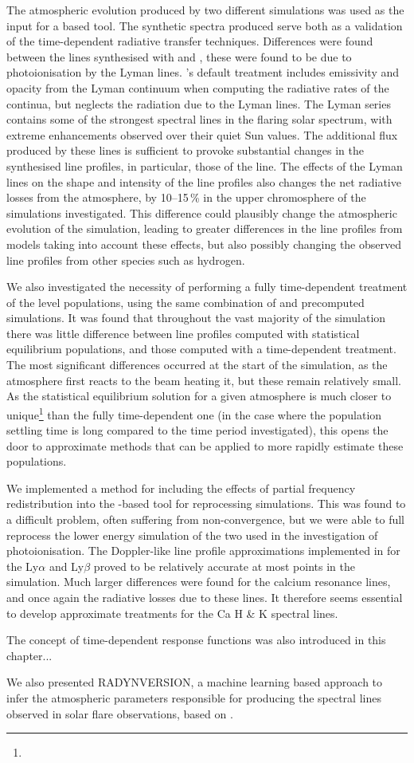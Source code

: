 The atmospheric evolution produced by two different \Radyn{} simulations was used as the input for a \Lw{} based tool.
The synthetic spectra produced serve both as a validation of the time-dependent radiative transfer techniques.
Differences were found between the \Caii{} lines synthesised with \Radyn{} and \Lw{}, these were found to be due to photoionisation by the Lyman lines.
\Radyn{}'s default treatment includes emissivity and opacity from the Lyman continuum when computing the radiative rates of the \Caii{} continua, but neglects the radiation due to the Lyman lines.
The Lyman series contains some of the strongest spectral lines in the flaring solar spectrum, with extreme enhancements observed over their quiet Sun values.
The additional flux produced by these lines is sufficient to provoke substantial changes in the synthesised \Caii{} line profiles, in particular, those of the \CaLine{} line.
The effects of the Lyman lines on the shape and intensity of the \Caii{} line profiles also changes the net radiative losses from the atmosphere, by 10--15\,\% in the upper chromosphere of the simulations investigated.
This difference could plausibly change the atmospheric evolution of the simulation, leading to greater differences in the \Caii{} line profiles from models taking into account these effects, but also possibly changing the observed line profiles from other species such as hydrogen.

We also investigated the necessity of performing a fully time-dependent treatment of the \Caii{} level populations, using the same combination of \Lw{} and precomputed \Radyn{} simulations.
It was found that throughout the vast majority of the simulation there was little difference between line profiles computed with statistical equilibrium populations, and those computed with a time-dependent treatment.
The most significant differences occurred at the start of the simulation, as the atmosphere first reacts to the beam heating it, but these remain relatively small.
As the statistical equilibrium solution for a given atmosphere is much closer to unique\footnote{} than the fully time-dependent one (in the case where the population settling time is long compared to the time period investigated), this opens the door to approximate methods that can be applied to more rapidly estimate these populations.

We implemented a method for including the effects of partial frequency redistribution into the \Lw{}-based tool for reprocessing \Radyn{} simulations.
This was found to a difficult problem, often suffering from non-convergence, but we were able to full reprocess the lower energy simulation of the two used in the investigation of \Caii{} photoionisation.
The Doppler-like line profile approximations implemented in \Radyn{} for the Ly$\alpha$ and Ly$\beta$ proved to be relatively accurate at most points in the simulation.
Much larger differences were found for the calcium resonance lines, and once again the radiative losses due to these lines.
It therefore seems essential to develop approximate treatments for the Ca H \& K spectral lines.

The concept of time-dependent response functions was also introduced in this chapter...

We also presented RADYNVERSION, a machine learning based approach to infer the atmospheric parameters responsible for producing the spectral lines observed in solar flare observations, based on \Radyn{}.
